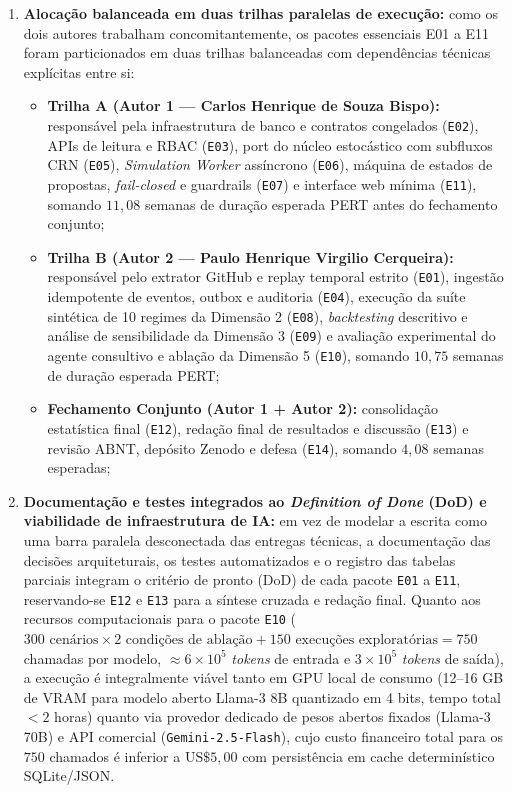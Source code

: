 \documentclass[12pt,openany,oneside,a4paper,english,brazilian,sumario=tradicional]{abntex2}
\begin{document}
\begin{enumerate}
  \item \textbf{Alocação balanceada em duas trilhas paralelas de execução:} como os dois autores trabalham concomitantemente, os pacotes essenciais E01 a E11 foram particionados em duas trilhas balanceadas com dependências técnicas explícitas entre si:
  \begin{itemize}
    \item \textbf{Trilha A (Autor 1 --- Carlos Henrique de Souza Bispo):} responsável pela infraestrutura de banco e contratos congelados (\texttt{E02}), APIs de leitura e RBAC (\texttt{E03}), port do núcleo estocástico com subfluxos CRN (\texttt{E05}), \textit{Simulation Worker} assíncrono (\texttt{E06}), máquina de estados de propostas, \textit{fail-closed} e guardrails (\texttt{E07}) e interface web mínima (\texttt{E11}), somando $11{,}08$ semanas de duração esperada PERT antes do fechamento conjunto;
    \item \textbf{Trilha B (Autor 2 --- Paulo Henrique Virgilio Cerqueira):} responsável pelo extrator GitHub e replay temporal estrito (\texttt{E01}), ingestão idempotente de eventos, outbox e auditoria (\texttt{E04}), execução da suíte sintética de 10 regimes da Dimensão 2 (\texttt{E08}), \textit{backtesting} descritivo e análise de sensibilidade da Dimensão 3 (\texttt{E09}) e avaliação experimental do agente consultivo e ablação da Dimensão 5 (\texttt{E10}), somando $10{,}75$ semanas de duração esperada PERT;
    \item \textbf{Fechamento Conjunto (Autor 1 + Autor 2):} consolidação estatística final (\texttt{E12}), redação final de resultados e discussão (\texttt{E13}) e revisão ABNT, depósito Zenodo e defesa (\texttt{E14}), somando $4{,}08$ semanas esperadas;
  \end{itemize}
  \item \textbf{Documentação e testes integrados ao \textit{Definition of Done} (DoD) e viabilidade de infraestrutura de IA:} em vez de modelar a escrita como uma barra paralela desconectada das entregas técnicas, a documentação das decisões arquiteturais, os testes automatizados e o registro das tabelas parciais integram o critério de pronto (DoD) de cada pacote \texttt{E01} a \texttt{E11}, reservando-se \texttt{E12} e \texttt{E13} para a síntese cruzada e redação final. Quanto aos recursos computacionais para o pacote \texttt{E10} ($300\text{ cenários} \times 2\text{ condições de ablação} + 150\text{ execuções exploratórias} = 750$ chamadas por modelo, $\approx 6 \times 10^5$ \textit{tokens} de entrada e $3 \times 10^5$ \textit{tokens} de saída), a execução é integralmente viável tanto em GPU local de consumo (12--16 GB de VRAM para modelo aberto Llama-3 8B quantizado em 4 bits, tempo total $< 2$ horas) quanto via provedor dedicado de pesos abertos fixados (Llama-3 70B) e API comercial (\texttt{Gemini-2.5-Flash}), cujo custo financeiro total para os $750$ chamados é inferior a $\text{US\$ } 5{,}00$ com persistência em cache determinístico SQLite/JSON.
\end{enumerate}
\end{document}
